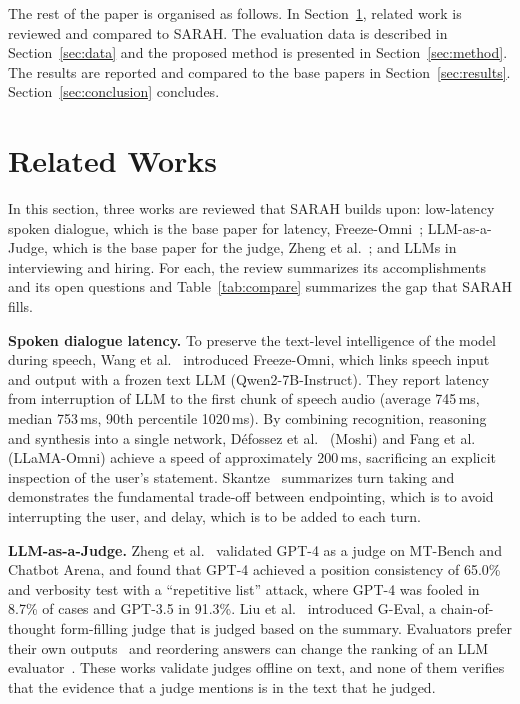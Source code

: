 \documentclass[conference]{IEEEtran}
\begin{document}
The rest of the paper is organised as follows. In Section~\ref{sec:related}, related work is reviewed and compared to SARAH. The evaluation data is described in Section~\ref{sec:data} and the proposed method is presented in Section~\ref{sec:method}. The results are reported and compared to the base papers in Section~\ref{sec:results}. Section~\ref{sec:conclusion} concludes.

\section{Related Works}\label{sec:related}

In this section, three works are reviewed that SARAH builds upon: low-latency spoken dialogue, which is the base paper for latency, Freeze-Omni~\cite{freezeomni}; LLM-as-a-Judge, which is the base paper for the judge, Zheng et al.~\cite{zheng2023}; and LLMs in interviewing and hiring. For each, the review summarizes its accomplishments and its open questions and Table~\ref{tab:compare} summarizes the gap that SARAH fills.

\textbf{Spoken dialogue latency.} To preserve the text-level intelligence of the model during speech, Wang et al.~\cite{freezeomni} introduced Freeze-Omni, which links speech input and output with a frozen text LLM (Qwen2-7B-Instruct). They report latency from interruption of LLM to the first chunk of speech audio (average 745\,ms, median 753\,ms, 90th percentile 1020\,ms). By combining recognition, reasoning and synthesis into a single network, D\'efossez et al.~\cite{moshi} (Moshi) and Fang et al.~\cite{llamaomni} (LLaMA-Omni) achieve a speed of approximately 200\,ms, sacrificing an explicit inspection of the user's statement. Skantze~\cite{skantze2021} summarizes turn taking and demonstrates the fundamental trade-off between endpointing, which is to avoid interrupting the user, and delay, which is to be added to each turn.

\textbf{LLM-as-a-Judge.} Zheng et al.~\cite{zheng2023} validated GPT-4 as a judge on MT-Bench and Chatbot Arena, and found that GPT-4 achieved a position consistency of 65.0\% and verbosity test with a ``repetitive list'' attack, where GPT-4 was fooled in 8.7\% of cases and GPT-3.5 in 91.3\%. Liu et al.~\cite{geval} introduced G-Eval, a chain-of-thought form-filling judge that is judged based on the summary. Evaluators prefer their own outputs~\cite{panickssery2024} and reordering answers can change the ranking of an LLM evaluator~\cite{wang2023fair}. These works validate judges offline on text, and none of them verifies that the evidence that a judge mentions is in the text that he judged.
\end{document}
